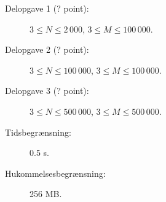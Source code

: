 \documentclass{boi2014-dk}
\begin{document}
    \Scoring

    \begin{description}
        \item[Delopgave 1 (? point):] $3 \le N \le 2\,000$, $3 \le M \le 100\,000$.
        \item[Delopgave 2 (? point):] $3 \le N \le 100\,000$, $3 \le M \le
            100\,000$.
        \item[Delopgave 3 (? point):] $3 \le N \le 500\,000$, $3 \le M \le
            500\,000$.
    \end{description}

    \Constraints

    \begin{description}
        \item[Tidsbegrænsning:] 0.5 s.
        \item[Hukommelsesbegrænsning:] 256 MB.
    \end{description}
\end{document}

